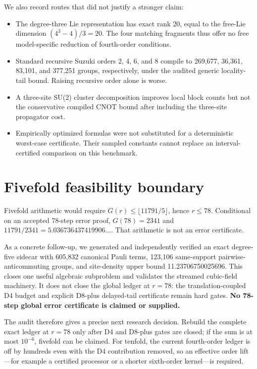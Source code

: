 \documentclass[11pt]{article}
\begin{document}
We also record routes that did not justify a stronger claim:
\begin{itemize}
  \item The degree-three Lie representation has exact rank 20, equal to the
        free-Lie dimension $(4^3-4)/3=20$.  The four matching fragments thus
        offer no free model-specific reduction of fourth-order conditions.
  \item Standard recursive Suzuki orders 2, 4, 6, and 8 compile to 269,677,
        36,361, 83,101, and 377,251 groups, respectively, under the audited
        generic locality-tail bound.  Raising recursive order alone is worse.
  \item A three-site SU(2) cluster decomposition improves local block counts
        but not the conservative compiled CNOT bound after including the
        three-site propagator cost.
  \item Empirically optimized formulas were not substituted for a deterministic
        worst-case certificate.  Their sampled constants cannot replace an
        interval-certified comparison on this benchmark.
\end{itemize}

\section{Fivefold feasibility boundary}

Fivefold arithmetic would require $G(r)\le\lfloor11791/5\rfloor$, hence
$r\le78$.  Conditional on an accepted 78-step error proof,
$G(78)=2341$ and $11791/2341=5.036736437419906\ldots$.  That arithmetic is not
an error certificate.

As a concrete follow-up, we generated and independently verified an exact
degree-five sidecar with 605,832 canonical Pauli terms, 123,106 same-support
pairwise-anticommuting groups, and site-density upper bound
11.23706750025696.  This closes one useful algebraic subproblem and validates
the streamed cubic-field machinery.  It does not close the global ledger at
$r=78$: the translation-coupled D4 budget and explicit D8-plus delayed-tail
certificate remain hard gates.  \textbf{No 78-step global error certificate is
claimed or supplied.}

The audit therefore gives a precise next research decision.  Rebuild the
complete exact ledger at $r=78$ only after D4 and D8-plus gates are closed; if
the sum is at most $10^{-6}$, fivefold can be claimed.  For tenfold, the
current fourth-order ledger is off by hundreds even with the D4 contribution
removed, so an effective order lift---for example a certified processor or a
shorter sixth-order kernel---is required.
\end{document}
